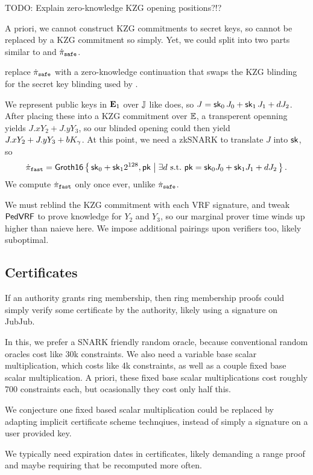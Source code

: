 TODO: Explain zero-knowledge KZG opening positions?!?

A priori, we cannot construct KZG commitments to secret keys,
so \pifast cannot be replaced by a KZG commitment so simply.
Yet, we could split \pifast into two parts similar to \pisafe and $\dot{\pi}_{\mathtt{safe}}$.

replace $\dot{\pi}_{\mathtt{safe}}$ with a zero-knowledge continuation
that swaps the KZG blinding for the secret key blinding used by \pifast.

We represent public keys in ${\mathbf{E}}_1$ over ${\mathbb{J}}$ like \pifast does,
so $J = \mathsf{sk}_0\, J_0 + \mathsf{sk}_1\, J_1 + d J_2$.
After placing these into a KZG commitment over ${\mathbb{E}}$, a transperent
openning yields $J.x Y_2 + J.y Y_3$, so our blinded opening could
then yield $J.x Y_2 + J.y Y_3 + b K_\gamma$.
At this point, we need a zkSNARK \pifastdot to translate $J$ into $\mathsf{sk}$, so
$$ \pifastdot = \rrSNARK \Setst{ \sk_0 + \sk_1 2^{128}, \pk }{ 
 \exists d \textrm{\ s.t.\ }
 \pk = \sk_0 \genJ_0 + \sk_1 \genJ_1 + d \genJ_2
} \mathperiod $$
We compute $\dot{\pi}_{\mathtt{fast}}$ only once ever, unlike $\dot{\pi}_{\mathtt{safe}}$.

We must reblind the KZG commitment with each VRF signature, and
tweak ${\mathsf{PedVRF}}$ to prove knowledge for $Y_2$ and $Y_3$, so 
our marginal prover time winds up higher than naieve \pifast here.
We impose additional pairings upon verifiers too, likely suboptimal.


\subsection{Certificates} %

If an authority grants ring membership, then ring membership proofs
could simply verify some certificate by the authority, likely using
a signature on JubJub.

In this, we prefer a SNARK friendly random oracle,
because conventional random oracles cost like 30k constraints.
We also need a variable base scalar multiplication, which costs like
4k constraints, as well as a couple fixed base scalar multiplication.
A priori, these fixed base scalar multiplications cost roughly 700
constraints each, but ocasionally they cost only half this.   

We conjecture one fixed based scalar multiplication could be replaced
by adapting implicit certificate scheme technqiues,
 instead of simply a signature on a user provided key.

We typically need expiration dates in certificates, likely demanding
a range proof and maybe requiring that \pifast be recomputed more often.


